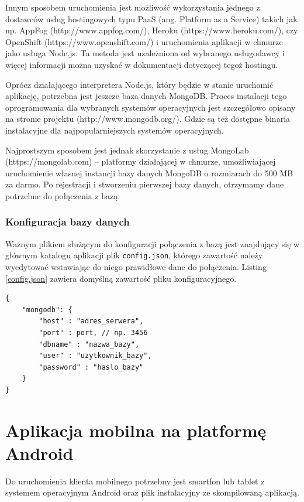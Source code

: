 \documentclass[twoside,a4paper,openright,12pt]{book}
\begin{document}
Innym sposobem uruchomienia jest możliwość wykorzystania jednego z dostawców usług hostingowych typu PaaS (ang. Platform as a Service) takich jak np. AppFog (http://www.appfog.com/), Heroku (https://www.heroku.com/), czy OpenShift (https://www.openshift.com/) i uruchomienia aplikacji w chmurze jako usługa Node.js. Ta metoda jest uzależniona od wybranego usługodawcy i więcej informacji można uzyskać w dokumentacji dotyczącej tegoż hostingu.

Oprócz działającego interpretera Node.js, który będzie w stanie uruchomić aplikację, potrzebna jest jeszcze baza danych MongoDB.
Proces instalacji tego oprogramowania dla wybranych systemów operacyjnych jest szczegółowo opisany na stronie projektu (http://www.mongodb.org/). Gdzie są też dostępne binaria instalacyjne dla najpopularniejszych systemów operacyjnych.

Najprostszym sposobem jest jednak skorzystanie z usług MongoLab (https://mongolab.com) -- platformy działającej w chmurze, umożliwiającej uruchomienie własnej instancji bazy danych MongoDB o rozmiarach do 500 MB za darmo.
Po rejestracji i stworzeniu pierwszej bazy danych, otrzymamy dane potrzebne do połączenia z bazą.

\subsubsection{Konfiguracja bazy danych}

Ważnym plikiem służącym do konfiguracji połączenia z bazą jest znajdujący się w głównym katalogu aplikacji plik \texttt{config.json}, którego zawartość należy wyedytować wstawiając do niego prawidłowe dane do połączenia.
Listing \ref{config.json} zawiera domyślną zawartość pliku konfiguracyjnego.\\


\begin{lstlisting}[frame=single,caption=Domyślna zawartość pliku z konfiguracją połączenia do bazy danych -- plik: /config.json]
{
	"mongodb": {
		"host" : "adres_serwera",
		"port" : port, // np. 3456
		"dbname" : "nazwa_bazy",
		"user" : "uzytkownik_bazy",
		"password" : "haslo_bazy"
	}
}
\end{lstlisting}\label{config.json}


\section{Aplikacja mobilna na platformę Android}

Do uruchomienia klienta mobilnego potrzebny jest smartfon lub tablet z systemem operacyjnym Android oraz plik instalacyjny ze skompilowaną aplikacją.
\end{document}
